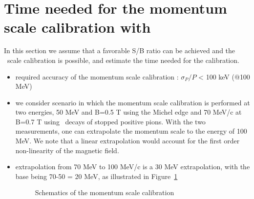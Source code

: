 \section{Time needed for the momentum scale calibration with \piplusenu\ }
In this section we assume that a favorable S/B ratio can be achieved
and the \piplusenu\  scale calibration is possible, and estimate the time needed
for the calibration.

\begin{itemize}
\item 
  required accuracy of the momentum scale calibration : $\sigma_P/P$ < 100 keV ($@$100 MeV)
\item
  we consider scenario in which the momentum scale calibration is performed at two energies,
  50 MeV and B=0.5 T using the Michel edge and 70 MeV/c at B=0.7 T using \piplusenu\ decays
  of stopped positive pions. With the two measurements, one can extrapolate the momentum
  scale to the energy of 100 MeV. We note that a linear extrapolation would account
  for the first order non-linearity of the magnetic field.
\item
  extrapolation from 70 MeV to 100 MeV/c is a 30 MeV extrapolation,
  with the base being 70-50 = 20 MeV, as illustrated in Figure~\ref{figure:calibration_cartoon}
 
\begin{figure}[H]
  \caption{
    \label{figure:calibration_cartoon}
    Schematics of the momentum scale calibration
  }
\end{figure}
  

\end{itemize}
